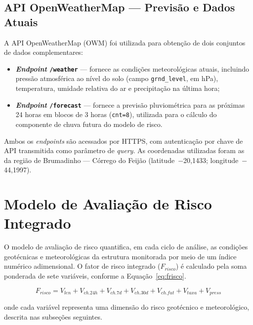 \subsection{API OpenWeatherMap — Previsão e Dados Atuais}
\label{subsec:owm}

A API OpenWeatherMap (OWM) foi utilizada para obtenção de dois
conjuntos de dados complementares:

\begin{itemize}
    \item \textbf{\textit{Endpoint} \texttt{/weather}} — fornece
    as condições meteorológicas atuais, incluindo pressão atmosférica
    ao nível do solo (campo \texttt{grnd\_level}, em hPa), temperatura,
    umidade relativa do ar e precipitação na última hora;

    \item \textbf{\textit{Endpoint} \texttt{/forecast}} — fornece
    a previsão pluviométrica para as próximas 24 horas em blocos de
    3 horas (\texttt{cnt=8}), utilizada para o cálculo do componente
    de chuva futura do modelo de risco.
\end{itemize}

Ambos os \textit{endpoints} são acessados por HTTPS, com
autenticação por chave de API transmitida como parâmetro de
\textit{query}. As coordenadas utilizadas foram as da região de
Brumadinho — Córrego do Feijão
(latitude~$-$20,1433; longitude~$-$44,1997).

\section{Modelo de Avaliação de Risco Integrado}
\label{sec:modelo-risco}

O modelo de avaliação de risco quantifica, em cada ciclo de análise,
as condições geotécnicas e meteorológicas da estrutura monitorada
por meio de um índice numérico adimensional. O fator de risco integrado
($F_{risco}$) é calculado pela soma ponderada de sete variáveis,
conforme a Equação~\ref{eq:frisco}.

\begin{equation}
\label{eq:frisco}
F_{risco} = V_{len} + V_{ch.24h} + V_{ch.7d} + V_{ch.30d}
            + V_{ch.fut} + V_{taxa} + V_{press}
\end{equation}

\noindent onde cada variável representa uma dimensão do risco geotécnico
e meteorológico, descrita nas subseções seguintes.

